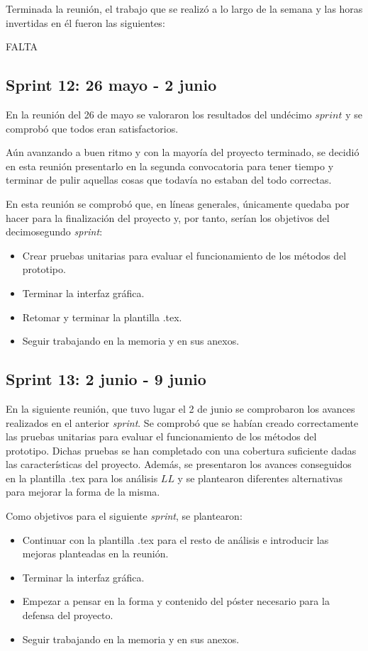 Terminada la reunión, el trabajo que se realizó a lo largo de la semana y las horas invertidas en él fueron las siguientes:

FALTA
\subsection{Sprint 12: 26 mayo - 2 junio}
En la reunión del 26 de mayo se valoraron los resultados del undécimo $sprint$ y se comprobó que todos eran satisfactorios.

Aún avanzando a buen ritmo y con la mayoría del proyecto terminado, se decidió en esta reunión presentarlo en la segunda convocatoria para tener tiempo y terminar de pulir aquellas cosas que todavía no estaban del todo correctas.

En esta reunión se comprobó que, en líneas generales, únicamente quedaba por hacer para la finalización del proyecto y, por tanto, serían los objetivos del decimosegundo \textit{sprint}:
\begin{itemize}
\item Crear pruebas unitarias para evaluar el funcionamiento de los métodos del prototipo.
\item Terminar la interfaz gráfica.
\item Retomar y terminar la plantilla .tex.
\item Seguir trabajando en la memoria y en sus anexos.
\end{itemize}


\subsection{Sprint 13: 2 junio - 9 junio}
En la siguiente reunión, que tuvo lugar el 2 de junio se comprobaron los avances realizados en el anterior \textit{sprint}. Se comprobó que se habían creado correctamente las pruebas unitarias para evaluar el funcionamiento de los métodos del prototipo. Dichas pruebas se han completado con una cobertura suficiente dadas las características del proyecto. Además, se presentaron los avances conseguidos en la plantilla .tex para los análisis $LL$ y se plantearon diferentes alternativas para mejorar la forma de la misma.

Como objetivos para el siguiente \textit{sprint}, se plantearon:
\begin{itemize}
\item Continuar con la plantilla .tex para el resto de análisis e introducir las mejoras planteadas en la reunión.
\item Terminar la interfaz gráfica.
\item Empezar a pensar en la forma y contenido del póster necesario para la defensa del proyecto.
\item Seguir trabajando en la memoria y en sus anexos.
\end{itemize}
